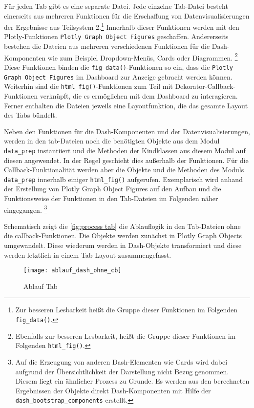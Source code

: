     Für jeden Tab gibt es eine separate Datei. Jede einzelne Tab-Datei besteht einerseits aus mehreren Funktionen für die Erschaffung von Datenvisualisierungen der
    Ergebnisse aus Teilsystem 2.\footnote{Zur besseren Lesbarkeit heißt die Gruppe dieser Funktionen im Folgenden \texttt{fig\_data()}.}
    Innerhalb dieser Funktionen werden mit den Plotly-Funktionen \texttt{Plotly Graph Object Figures} geschaffen. 
    Andererseits bestehen die Dateien aus mehreren verschiedenen Funktionen für die Dash-Komponenten wie zum Beispiel Dropdown-Menüs, Cards oder Diagrammen.
    \footnote{Ebenfalls zur besseren Lesbarkeit, heißt die Gruppe dieser Funktionen im Folgenden \texttt{html\_fig()}.}
    Diese Funktionen binden die \texttt{fig\_data()}-Funktionen so ein, dass die \texttt{Plotly Graph Object Figures} im Dashboard zur Anzeige gebracht werden können. 
    Weiterhin sind die \texttt{html\_fig()}-Funktionen zum Teil mit Dekorator-Callback-Funktionen verknüpft, die es ermöglichen mit dem Dashboard zu interagieren. 
    Ferner enthalten die Dateien jeweils eine Layoutfunktion, die das gesamte Layout des
    Tabs bündelt.

    Neben den Funktionen für die Dash-Komponenten und der Datenvisualisierungen, werden in den tab-Dateien noch die benötigten Objekte aus dem Modul \texttt{data\_prep} 
    instantiiert und die Methoden der Kindklassen aus diesem Modul auf diesen angewendet. In der Regel geschieht dies außerhalb der Funktionen.
    Für die Callback-Funktionalität werden aber die Objekte und die Methoden des Moduls \texttt{data\_prep} innerhalb einiger \texttt{html\_fig()} aufgerufen.
    Exemplarisch wird anhand der Erstellung von Plotly Graph Object Figures auf den Aufbau und die Funktionsweise der Funktionen in den Tab-Dateien im Folgenden näher eingegangen.
    \footnote{Auf die Erzeugung von anderen Dash-Elementen wie Cards wird dabei aufgrund der Übersichtlichkeit der Darstellung nicht Bezug genommen. Diesem liegt ein ähnlicher Prozess
    zu Grunde. Es werden aus den berechneten Ergebnissen der Objekte direkt Dash-Komponenten mit Hilfe der \texttt{dash\_bootstrap\_components} erstellt.}
    
    Schematisch zeigt die \autoref{fig:process tab} die Ablauflogik in den Tab-Dateien ohne die callback-Funktionen.
    Die Objekte werden zunächst in Plotly Graph Objects umgewandelt. Diese wiederum werden in Dash-Objekte transformiert und diese werden 
    letztlich in einem Tab-Layout zusammengefasst.
    
    \begin{figure}[H]
        \centering
            \texttt{[image: ablauf\_dash\_ohne\_cb]}
            \caption{Ablauf Tab}
            \label{fig:process tab}
    \end{figure}

